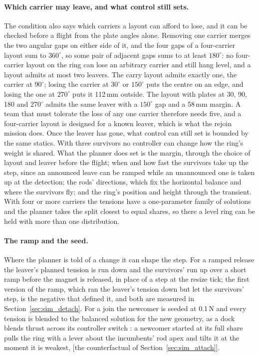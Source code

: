 \paragraph{Which carrier may leave, and what control still sets.} The condition also says which carriers a layout
can afford to lose, and it can be checked before a flight from the plate angles alone. Removing one carrier merges
the two angular gaps on either side of it, and the four gaps of a four-carrier layout sum to $360^\circ$, so some
pair of adjacent gaps sums to at least $180^\circ$: no four-carrier layout on the ring can lose an arbitrary
carrier and still hang level, and a layout admits at most two leavers. The carry layout admits exactly one, the
carrier at $90^\circ$; losing the carrier at $30^\circ$ or $150^\circ$ puts the centre on an edge, and losing the one
at $270^\circ$ puts it 112\,mm outside. The layout with plates at 30, 90, 180 and 270$^\circ$ admits the same
leaver with a $150^\circ$ gap and a 58\,mm margin. A team that must tolerate the loss of any one carrier therefore
needs five, and a four-carrier layout is designed for a known leaver, which is what the rejoin mission does.
Once the leaver has gone, what control can still set is bounded by the same statics. With three survivors no
controller can change how the ring's weight is shared. What the planner does set is the margin, through the choice
of layout and leaver before the flight; when and how fast the survivors take up the step, since an announced leave
can be ramped while an unannounced one is taken up at the detection; the rods' directions, which fix the horizontal
balance and where the survivors fly; and the ring's position and height through the transient. With four or more
carriers the tensions have a one-parameter family of solutions and the planner takes the split closest to equal
shares, so there a level ring can be held with more than one distribution.

\paragraph{The ramp and the seed.} Where the planner is told of a change it can shape the step. For a ramped
release the leaver's planned tension is run down and the survivors' run up over a short ramp before the magnet is
released, in place of a step at the resize tick; the first version of the ramp, which ran the leaver's tension
down but let the survivors' step, is the negative that defined it, and both are measured in
Section~\ref{sec:sim_detach}. For a join the newcomer is seeded at 0.1\,N and every tension is blended to the
balanced solution for the new geometry, as a dock blends thrust across its controller switch
\cite{sugihara2023trady}: a newcomer started at its full share pulls the ring with a lever about the incumbents'
rod apex and tilts it at the moment it is weakest, [the counterfactual of Section~\ref{sec:sim_attach}].

